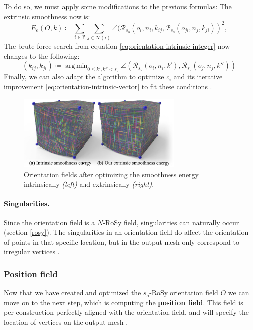 \documentclass{ACGSeminar}
\DeclareMathOperator*{\argmin}{arg\,min}
\begin{document}
To do so, we must apply some modifications to the previous formulas:
The extrinsic smoothness now is:
\begin{equation}\label{eq:orientation-extrinsic-energy}
	E_e(O,k) \coloneqq \sum_{i \in \mathcal{V}} \sum_{j \in \mathcal{N}(i)} \angle(\mathcal{R}_{s_o}(o_{i}, n_i, k_{ij}, \mathcal{R}_{s_o}(o_{ji}, n_j, k_{ji}))^2,
\end{equation}
The brute force search from equation \eqref{eq:orientation-intrinsic-integer} now changes to the following:
\begin{equation}\label{eq:orientation-extrinsic-integer}
	(k_{ij}, k_{ji}) \coloneqq \argmin_{0 \leq k',k'' < s_o} \angle(\mathcal{R}_{s_o}(o_i, n_i, k'), \mathcal{R}_{s_o}(o_j, n_j, k''))
\end{equation}
Finally, we can also adapt the algorithm to optimize $o_i$ and its iterative improvement \eqref{eq:orientation-intrinsic-vector} to fit these conditions \cite{jakob2015instant}.

\begin{figure}[htb!]
	\begin{centering}
		\includegraphics[width=8cm]{img/orientation-field-illustration.png}\par
	\end{centering}
	\caption{Orientation fields after optimizing the smoothness energy intrinsically \textit{(left)} and extrinsically \textit{(right)}. \cite{jakob2015instant}}
	\label{fig:orientation-field-illustration}
\end{figure}

\paragraph{Singularities.}
Since the orientation field is a $N$-RoSy field, singularities can naturally occur (section \ref{rosy}). The singularities in an orientation field do affect the orientation of points in that specific location, but in the output mesh only correspond to irregular vertices \cite{jakob2015instant}.

\subsubsection{Position field}
Now that we have created and optimized the $s_o$-RoSy orientation field $O$ we can move on to the next step, which is computing the \textbf{position field}. This field is per construction perfectly aligned with the orientation field, and will specify the location of vertices on the output mesh \cite{jakob2015instant}.\bigskip
\end{document}
